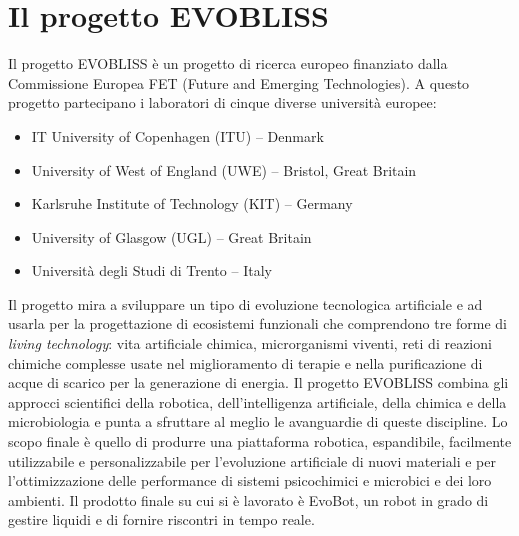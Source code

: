 \section{Il progetto EVOBLISS}
\label{sec:context}
Il progetto EVOBLISS  è un progetto di ricerca europeo finanziato dalla Commissione Europea FET (Future and Emerging Technologies). A questo progetto partecipano i laboratori di cinque diverse università europee:
\begin{itemize}
\item IT University of Copenhagen (ITU) – Denmark
\item University of West of England (UWE) – Bristol, Great Britain
\item Karlsruhe Institute of Technology (KIT) – Germany
\item University of Glasgow (UGL) – Great Britain
\item Università degli Studi di Trento – Italy
\end{itemize}
Il progetto mira a sviluppare un tipo di evoluzione tecnologica artificiale e ad usarla per la progettazione di ecosistemi funzionali che comprendono tre forme di \emph{living technology}: vita artificiale chimica, microrganismi viventi, reti di reazioni chimiche complesse usate nel miglioramento di terapie e nella purificazione di acque di scarico per la generazione di energia.
Il progetto EVOBLISS combina gli approcci scientifici della robotica, dell'intelligenza artificiale, della chimica e della microbiologia e punta a sfruttare al meglio le avanguardie di queste discipline. Lo scopo finale è quello di produrre una piattaforma robotica, espandibile, facilmente utilizzabile e personalizzabile per l'evoluzione artificiale di nuovi materiali e per l'ottimizzazione delle performance di sistemi psicochimici e microbici e dei loro ambienti. Il prodotto finale su cui si è lavorato è EvoBot, un robot in grado di gestire liquidi e di fornire riscontri in tempo reale. 

